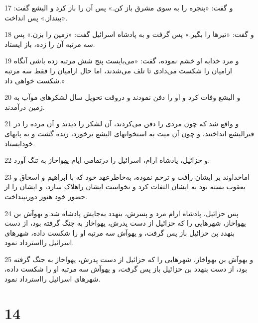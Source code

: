 \par 17 و گفت: «پنجره را به سوی مشرق باز کن.» پس آن را باز کرد و الیشع گفت: «بینداز.» پس انداخت.
\par 18 و گفت: «تیرها را بگیر.» پس گرفت و به پادشاه اسرائیل گفت: «زمین را بزن.» پس سه مرتبه آن را زده، باز ایستاد.
\par 19 و مرد خدابه او خشم نموده، گفت: «می‌بایست پنج شش مرتبه زده باشی آنگاه ارامیان را شکست می‌دادی تا تلف می‌شدند، اما حال ارامیان را فقط سه مرتبه شکست خواهی داد.»
\par 20 و الیشع وفات کرد و او را دفن نمودند و دروقت تحویل سال لشکرهای موآب به زمین درآمدند.
\par 21 و واقع شد که چون مردی را دفن می‌کردند، آن لشکر را دیدند و آن مرده را در قبرالیشع انداختند، و چون آن میت به استخوانهای الیشع برخورد، زنده گشت و به پایهای خودایستاد.
\par 22 و حزائیل، پادشاه ارام، اسرائیل را درتمامی ایام یهواخاز به تنگ آورد.
\par 23 اماخداوند بر ایشان رافت و ترحم نموده، به‌خاطرعهد خود که با ابراهیم و اسحاق و یعقوب بسته بود به ایشان التفات کرد و نخواست ایشان راهلاک سازد، و ایشان را از حضور خود هنوز دورنینداخت.
\par 24 پس حزائیل، پادشاه ارام مرد و پسرش، بنهدد به‌جایش پادشاه شد.و یهوآش بن یهواخاز، شهرهایی را که حزائیل از دست پدرش، یهواخاز به جنگ گرفته بود، از دست بنهدد بن حزائیل باز پس گرفت، و یهوآش سه مرتبه او را شکست داده، شهرهای اسرائیل رااسترداد نمود.
\par 25 و یهوآش بن یهواخاز، شهرهایی را که حزائیل از دست پدرش، یهواخاز به جنگ گرفته بود، از دست بنهدد بن حزائیل باز پس گرفت، و یهوآش سه مرتبه او را شکست داده، شهرهای اسرائیل رااسترداد نمود.
 
\chapter{14}

